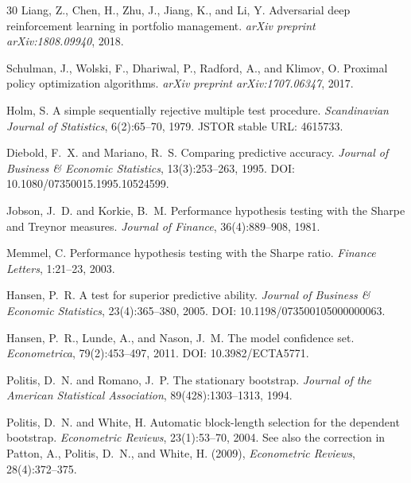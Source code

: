 \documentclass{article}
\begin{document}
\begin{thebibliography}{30}
Liang, Z., Chen, H., Zhu, J., Jiang, K., and Li, Y.
\newblock Adversarial deep reinforcement learning in portfolio management.
\newblock \emph{arXiv preprint arXiv:1808.09940}, 2018.

Schulman, J., Wolski, F., Dhariwal, P., Radford, A., and Klimov, O.
\newblock Proximal policy optimization algorithms.
\newblock \emph{arXiv preprint arXiv:1707.06347}, 2017.

Holm, S.
\newblock A simple sequentially rejective multiple test procedure.
\newblock \emph{Scandinavian Journal of Statistics}, 6(2):65--70, 1979.
\newblock JSTOR stable URL: 4615733.

Diebold, F.~X. and Mariano, R.~S.
\newblock Comparing predictive accuracy.
\newblock \emph{Journal of Business \& Economic Statistics}, 13(3):253--263, 1995.
\newblock DOI: 10.1080/07350015.1995.10524599.

Jobson, J.~D. and Korkie, B.~M.
\newblock Performance hypothesis testing with the Sharpe and Treynor measures.
\newblock \emph{Journal of Finance}, 36(4):889--908, 1981.

Memmel, C.
\newblock Performance hypothesis testing with the Sharpe ratio.
\newblock \emph{Finance Letters}, 1:21--23, 2003.

Hansen, P.~R.
\newblock A test for superior predictive ability.
\newblock \emph{Journal of Business \& Economic Statistics}, 23(4):365--380, 2005.
\newblock DOI: 10.1198/073500105000000063.

Hansen, P.~R., Lunde, A., and Nason, J.~M.
\newblock The model confidence set.
\newblock \emph{Econometrica}, 79(2):453--497, 2011.
\newblock DOI: 10.3982/ECTA5771.

Politis, D.~N. and Romano, J.~P.
\newblock The stationary bootstrap.
\newblock \emph{Journal of the American Statistical Association}, 89(428):1303--1313, 1994.

Politis, D.~N. and White, H.
\newblock Automatic block-length selection for the dependent bootstrap.
\newblock \emph{Econometric Reviews}, 23(1):53--70, 2004.
\newblock See also the correction in Patton, A., Politis, D.~N., and White, H. (2009), \emph{Econometric Reviews}, 28(4):372--375.

\end{thebibliography}
\end{document}
